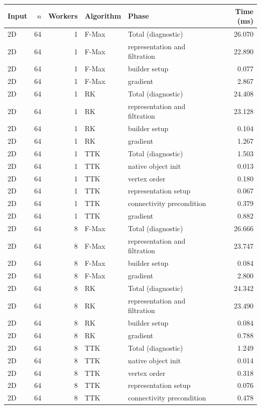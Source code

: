 \begin{tabular}{lrrllr}
\hline
Input & $n$ & Workers & Algorithm & Phase & Time (ms) \\
\hline
2D & 64 & 1 & F-Max & Total (diagnostic) & 26.070 \\
2D & 64 & 1 & F-Max & representation and filtration & 22.890 \\
2D & 64 & 1 & F-Max & builder setup & 0.077 \\
2D & 64 & 1 & F-Max & gradient & 2.867 \\
2D & 64 & 1 & RK & Total (diagnostic) & 24.408 \\
2D & 64 & 1 & RK & representation and filtration & 23.128 \\
2D & 64 & 1 & RK & builder setup & 0.104 \\
2D & 64 & 1 & RK & gradient & 1.267 \\
2D & 64 & 1 & TTK & Total (diagnostic) & 1.503 \\
2D & 64 & 1 & TTK & native object init & 0.013 \\
2D & 64 & 1 & TTK & vertex order & 0.180 \\
2D & 64 & 1 & TTK & representation setup & 0.067 \\
2D & 64 & 1 & TTK & connectivity precondition & 0.379 \\
2D & 64 & 1 & TTK & gradient & 0.882 \\
2D & 64 & 8 & F-Max & Total (diagnostic) & 26.666 \\
2D & 64 & 8 & F-Max & representation and filtration & 23.747 \\
2D & 64 & 8 & F-Max & builder setup & 0.084 \\
2D & 64 & 8 & F-Max & gradient & 2.800 \\
2D & 64 & 8 & RK & Total (diagnostic) & 24.342 \\
2D & 64 & 8 & RK & representation and filtration & 23.490 \\
2D & 64 & 8 & RK & builder setup & 0.084 \\
2D & 64 & 8 & RK & gradient & 0.788 \\
2D & 64 & 8 & TTK & Total (diagnostic) & 1.249 \\
2D & 64 & 8 & TTK & native object init & 0.014 \\
2D & 64 & 8 & TTK & vertex order & 0.318 \\
2D & 64 & 8 & TTK & representation setup & 0.076 \\
2D & 64 & 8 & TTK & connectivity precondition & 0.478 \\

\end{tabular}
